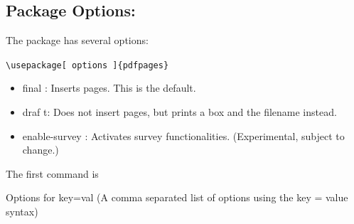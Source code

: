 	\subsection{Package Options:}

	The package has several options:

	\verb|\usepackage[ options ]{pdfpages}|

	\begin{itemize}
	\item final : Inserts pages. This is the default.
	\item draf t: Does not insert pages, but prints a box and the filename instead.
	\item enable-survey : Activates survey functionalities. (Experimental, subject to change.)
	\end{itemize}
	
	The first command is

	\verb||
	
	Options for key=val (A comma separated list of options using the key = value syntax)
	
